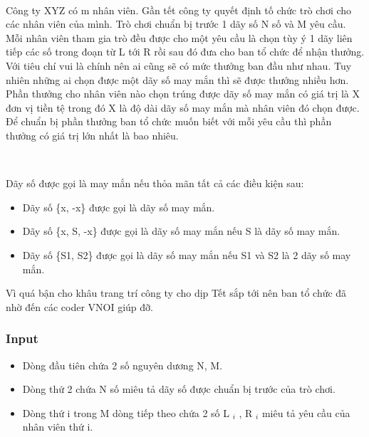 

 

Công ty XYZ có m nhân viên. Gần tết công ty quyết định tố chức trò chơi cho các nhân viên của mình. Trò chơi chuẩn bị trước 1 dãy số N số và M yêu cầu. Mỗi nhân viên tham gia trò đều được cho một yêu cầu là chọn tùy ý 1 dãy liên tiếp các số trong đoạn từ L tới R rồi sau đó đưa cho ban tổ chức để nhận thưởng. Với tiêu chí vui là chính nên ai cũng sẽ có mức thưởng ban đầu như nhau. Tuy nhiên những ai chọn được một dãy số may mắn thì sẽ được thưởng nhiều hơn. Phần thưởng cho nhân viên nào chọn trúng được dãy số may mắn có giá trị là X đơn vị tiền tệ trong đó X là độ dài dãy số may mắn mà nhân viên đó chọn được. Để chuẩn bị phần thưởng ban tổ chức muốn biết với mỗi yêu cầu thì phần thưởng có giá trị lớn nhất là bao nhiêu.

 

Dãy số được gọi là may mắn nếu thỏa mãn tất cả các điều kiện sau:
\begin{itemize}
	\item 

Dãy số \{x, -x\} được gọi là dãy số may mắn.
\end{itemize}
\begin{itemize}
	\item 

Dãy số \{x, S, -x\} được gọi là dãy số may mắn nếu S là dãy số may mắn.
\end{itemize}
\begin{itemize}
	\item 

Dãy số \{S1, S2\} được gọi là dãy số may mắn nếu S1 và S2 là 2 dãy số may mắn.
\end{itemize}

Vì quá bận cho khâu trang trí công ty cho dịp Tết sắp tới nên ban tổ chức đã nhờ đến các coder VNOI giúp đỡ.

\subsubsection{Input}
\begin{itemize}
	\item Dòng đầu tiên chứa 2 số nguyên dương N, M.
	\item Dòng thứ 2 chứa N số miêu tả dãy số được chuẩn bị trước của trò chơi.
	\item Dòng thứ i trong M dòng tiếp theo chứa 2 số L $_ i $ , R $_ i $ miêu tả yêu cầu của nhân viên thứ i.
\end{itemize}

